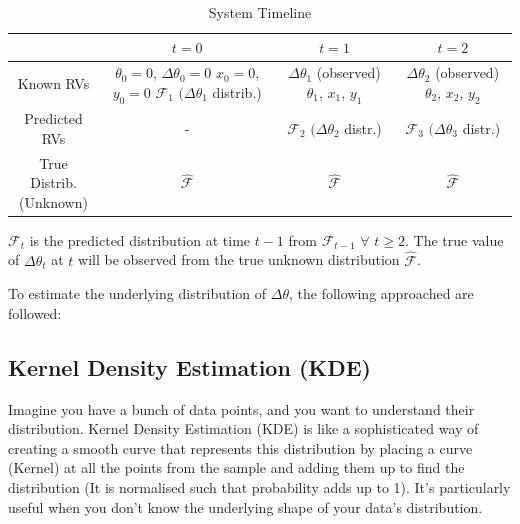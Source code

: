 \documentclass[conference]{IEEEtran}
\begin{document}
\begin{table}[h!]
    \centering
    \renewcommand{\arraystretch}{1.75} %
    \small  %
    \begin{tabular}{|c|c|c|c|}
        \hline
        & $t=0$ & $t=1$ & $t=2$ \\
        \hline
        Known RVs & \parbox[c]{2.25cm}{\centering $\theta_0=0$, $\Delta \theta_0 = 0$ \\ $x_0=0$, $y_0=0$ \\ $\mathcal{F}_{1}$ $(\Delta \theta_1$ distrib.)}  & \parbox[c]{2.35cm}{\centering $\Delta \theta_1$ (observed) \\ $\theta_1$, $x_1$, $y_1$} & \parbox[c]{2.35cm}{\centering $\Delta \theta_2$ (observed) \\ $\theta_2$, $x_2$, $y_2$} \\
        \hline
        Predicted RVs & - & $\mathcal{F}_{2}$ $(\Delta \theta_2$ distr.) & $\mathcal{F}_{3}$ $(\Delta \theta_3$ distr.) \\
        \hline
        \parbox[c]{1.8cm}{\centering True Distrib.\\ (Unknown)} & $\hat{\mathcal{F}}$ & $\hat{\mathcal{F}}$ & $\hat{\mathcal{F}}$ \\
        \hline
    \end{tabular}
    \vspace{0.2cm}  %
    \caption{System Timeline}
    \raggedright
    $\mathcal{F}_{t}$ is the predicted distribution at time $t-1$ from $\mathcal{F}_{t-1}$ $\forall$ $t \geq 2$. The true value of $\Delta \theta_t$ at $t$ will be observed from the true unknown distribution $\hat{\mathcal{F}}$.
    \label{tab:sample_table}
\end{table}

To estimate the underlying distribution of $\Delta \theta$, the following approached are followed:
\subsection{Kernel Density Estimation (KDE)}
Imagine you have a bunch of data points, and you want
to understand their distribution. Kernel Density Estimation
(KDE) is like a sophisticated way of creating a smooth
curve that represents this distribution by placing a curve (Kernel) at all the points from the sample and adding them up to find the distribution (It is normalised such that probability adds up to 1). It’s particularly useful when you don’t know the underlying shape of your data’s distribution.
\end{document}

